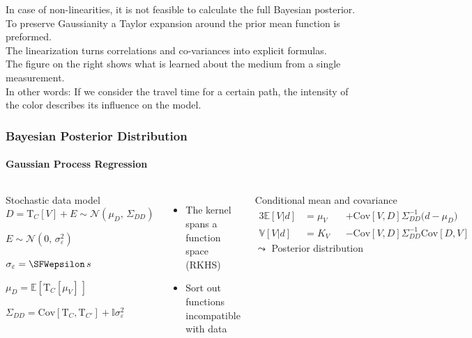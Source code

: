 \documentclass[aspectratio=169, t, 10pt,
    ignorenonframetext,
    ]{beamer}
\newcommand\Mean[1]{\mathbb{E}\!\left[#1\right]}
\newcommand\Var[1]{\mathbb{V}\!\left[#1\right]}
\newcommand\Cov[2]{\mathrm{Cov}\!\left[#1,#2\right]}
\newcommand\Gauss[2]{\mathcal{N}\!\left({#1},\,{#2}\right)}
\newcommand{\Identity}{\mathbb{I}}
\begin{document}
In case of non-linearities, it is not feasible to calculate the full Bayesian posterior.
\\
To preserve Gaussianity a Taylor expansion around the prior mean function is preformed.
\\
The linearization turns correlations and co-variances into explicit formulas.
\\[2mm]

The figure on the right shows what is learned about the medium from a single measurement.
\\
In other words: If we consider the travel time for a certain path, the intensity of the color describes its influence on the model.


\begin{frame}
    \frametitle{Bayesian Posterior Distribution}
    \framesubtitle{Gaussian Process Regression}

\begin{columns}

    \begin{block}{Stochastic data model}
        \begin{equation}
            D = \mathrm T_C[V] + E \sim \Gauss{\mu_D}{\Sigma_{DD}}
        \end{equation}
        \begin{description}[labelwidth=25mm]
            \item [Error model]        $E\sim \Gauss{0}{\sigma_\varepsilon^2}$
            \item [Uncertainty]        $\sigma_\varepsilon = \SFWepsilon\,s$
            \item [Prior travel times] $\mu_D = \Mean{\mathrm T_C[\mu_V]\,}$
            \item [Covariance matrix]  $\Sigma_{DD} = \Cov{\mathrm T_C}{\mathrm T_{C'}} + \Identity \sigma_\varepsilon^2$
        \end{description}
    \end{block}

    \begin{itemize}
        \item The kernel spans a function space (RKHS)
        \item Sort out functions incompatible with data
    \end{itemize}


    \begin{exampleblock}{Conditional mean and covariance}
        \setlength\abovedisplayskip{0pt}
        \begin{alignat}{3}
            \Mean{V|d} &= \mu_V &&+ \Cov VD \Sigma_{DD}^{-1} \big( d - \mu_{D} \big)
            \\
            \Var{V|d}  &= K_V   &&- \Cov VD \Sigma_{DD}^{-1} \Cov DV
        \end{alignat}
        \hfill {\Large $\leadsto$} Posterior distribution \phantom{p}
    \end{exampleblock}


\end{columns}
\end{frame}
\end{document}
